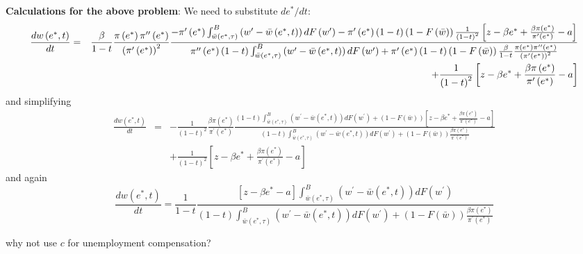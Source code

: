 \documentclass[11pt]{article}
\newenvironment{draftnote}[1][Draft note]{}{}
\begin{document}
\begin{draftnote}
\textbf{Calculations for the above problem}: We need to substitute $de^{\ast
}/dt$:%
\begin{eqnarray*}
\frac{dw\left( e^{\ast },t\right) }{dt} &=&\frac{\beta }{1-t}\frac{\pi
\left( e^{\ast }\right) \pi ^{\prime \prime }\left( e^{\ast }\right) }{%
\left( \pi ^{\prime }\left( e^{\ast }\right) \right) ^{2}}\frac{-\pi
^{\prime }\left( e^{\ast }\right) \int_{\bar{w}\left( e^{\ast },\tau \right)
}^{B}\left( w^{\prime }-\bar{w}\left( e^{\ast },t\right) \right) dF\left(
w^{\prime }\right) -\pi ^{\prime }\left( e^{\ast }\right) \left( 1-t\right)
\left( 1-F\left( \bar{w}\right) \right) \frac{1}{\left( 1-t\right) ^{2}}%
\left[ z-\beta e^{\ast }+\frac{\beta \pi \left( e^{\ast }\right) }{\pi
^{\prime }\left( e^{\ast }\right) }-a\right] }{\pi ^{\prime \prime }\left(
e^{\ast }\right) \left( 1-t\right) \int_{\bar{w}\left( e^{\ast },\tau
\right) }^{B}\left( w^{\prime }-\bar{w}\left( e^{\ast },t\right) \right)
dF\left( w^{\prime }\right) +\pi ^{\prime }\left( e^{\ast }\right) \left(
1-t\right) \left( 1-F\left( \bar{w}\right) \right) \frac{\beta }{1-t}\frac{%
\pi \left( e^{\ast }\right) \pi ^{\prime \prime }\left( e^{\ast }\right) }{%
\left( \pi ^{\prime }\left( e^{\ast }\right) \right) ^{2}}} \\
&&+\frac{1}{\left( 1-t\right) ^{2}}\left[ z-\beta e^{\ast }+\frac{\beta \pi
\left( e^{\ast }\right) }{\pi ^{\prime }\left( e^{\ast }\right) }-a\right] 
\end{eqnarray*}%
and simplifying%
\begin{eqnarray*}
\frac{dw\left( e^{\ast },t\right) }{dt} &=&-\frac{1}{\left( 1-t\right) ^{2}}%
\frac{\beta \pi \left( e^{\ast }\right) }{\pi ^{\prime }\left( e^{\ast
}\right) }\frac{\left( 1-t\right) \int_{\bar{w}\left( e^{\ast },\tau \right)
}^{B}\left( w^{\prime }-\bar{w}\left( e^{\ast },t\right) \right) dF\left(
w^{\prime }\right) +\left( 1-F\left( \bar{w}\right) \right) \left[ z-\beta
e^{\ast }+\frac{\beta \pi \left( e^{\ast }\right) }{\pi ^{\prime }\left(
e^{\ast }\right) }-a\right] }{\left( 1-t\right) \int_{\bar{w}\left( e^{\ast
},\tau \right) }^{B}\left( w^{\prime }-\bar{w}\left( e^{\ast },t\right)
\right) dF\left( w^{\prime }\right) +\left( 1-F\left( \bar{w}\right) \right) 
\frac{\beta \pi \left( e^{\ast }\right) }{\pi ^{\prime }\left( e^{\ast
}\right) }} \\
&&+\frac{1}{\left( 1-t\right) ^{2}}\left[ z-\beta e^{\ast }+\frac{\beta \pi
\left( e^{\ast }\right) }{\pi ^{\prime }\left( e^{\ast }\right) }-a\right] 
\end{eqnarray*}%
and again%
\begin{equation*}
\frac{dw\left( e^{\ast },t\right) }{dt}=\frac{1}{1-t}\frac{\left[ z-\beta
e^{\ast }-a\right] \int_{\bar{w}\left( e^{\ast },\tau \right) }^{B}\left(
w^{\prime }-\bar{w}\left( e^{\ast },t\right) \right) dF\left( w^{\prime
}\right) }{\left( 1-t\right) \int_{\bar{w}\left( e^{\ast },\tau \right)
}^{B}\left( w^{\prime }-\bar{w}\left( e^{\ast },t\right) \right) dF\left(
w^{\prime }\right) +\left( 1-F\left( \bar{w}\right) \right) \frac{\beta \pi
\left( e^{\ast }\right) }{\pi ^{\prime }\left( e^{\ast }\right) }}
\end{equation*}
\end{draftnote}

\begin{draftnote}
why not use $c$ for unemployment compensation?
\end{draftnote}
\end{document}
